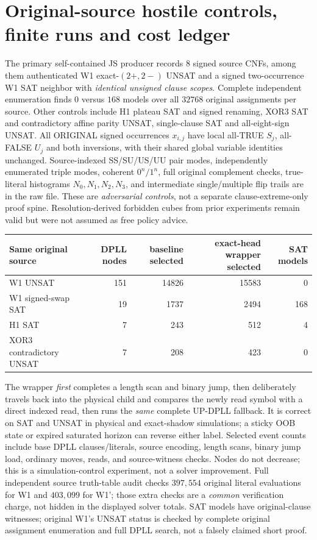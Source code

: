 \documentclass[10pt]{article}
\begin{document}
\section{Original-source hostile controls, finite runs and cost ledger}
The primary self-contained JS producer records 8 signed source CNFs, among them authenticated W1 exact-$(2+,2-)$ UNSAT and a signed two-occurrence W1 SAT neighbor with \emph{identical unsigned clause scopes}. Complete independent enumeration finds $0$ versus $168$ models over all $32768$ original assignments per source. Other controls include H1 plateau SAT and signed renaming, XOR3 SAT and contradictory affine parity UNSAT, single-clause SAT and all-eight-sign UNSAT. All ORIGINAL signed occurrences $x_{i,j}$ have local all-TRUE $S_j$, all-FALSE $U_j$ and both inversions, with their shared global variable identities unchanged. Source-indexed SS/SU/US/UU pair modes, independently enumerated triple modes, coherent $0^n/1^n$, full original complement checks, true-literal histograms $N_0,N_1,N_2,N_3$, and intermediate single/multiple flip trails are in the raw file. These are \emph{adversarial controls}, not a separate clause-extreme-only proof spine. Resolution-derived forbidden cubes from prior experiments remain valid but were not assumed as free policy advice.
\begin{center}\begin{tabular}{lrrrr}\toprule
Same original source & DPLL nodes & baseline selected & exact-head wrapper selected & SAT models\\\midrule
W1 UNSAT&151&14826&15583&0\\
W1 signed-swap SAT&19&1737&2494&168\\
H1 SAT&7&243&512&4\\
XOR3 contradictory UNSAT&7&208&423&0\\\bottomrule
\end{tabular}\end{center}
The wrapper \emph{first} completes a length scan and binary jump, then deliberately travels back into the physical child and compares the newly read symbol with a direct indexed read, then runs the \emph{same} complete UP-DPLL fallback. It is correct on SAT and UNSAT in physical and exact-shadow simulations; a sticky OOB state or expired saturated horizon can reverse either label. Selected event counts include base DPLL clauses/literals, source encoding, length scans, binary jump load, ordinary moves, reads, and source-witness checks. Nodes do not decrease; this is a simulation-control experiment, not a solver improvement. Full independent source truth-table audit checks $397{,}554$ original literal evaluations for W1 and $403{,}099$ for W1'; those extra checks are a \emph{common} verification charge, not hidden in the displayed solver totals. SAT models have original-clause witnesses; original W1's UNSAT status is checked by complete original assignment enumeration and full DPLL search, not a falsely claimed short proof.
\end{document}
